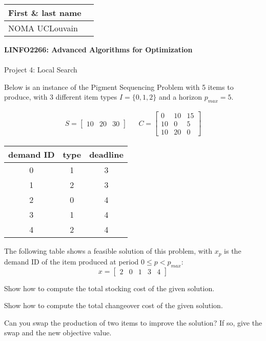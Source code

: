\documentclass[12pt]{report}
\newcommand{\answerbox}[2]{\hfill\break\\
        \framebox[\linewidth]{\parbox[c][#1][c]{\dimexpr\linewidth-2\fboxsep-2\fboxrule}{#2}}
}
\begin{document}
\hfill
\begingroup
\Large
\begin{tabular}{|l|p{6cm}|}
	\hline
	First \& last name &
	\\ \hline
	NOMA UCLouvain & 
	\\ \hline
\end{tabular}
\endgroup
\vspace{1.5cm}

\noindent
\begingroup
	\Large
	\textbf{LINFO2266: Advanced Algorithms for Optimization}\\\\
	Project 4: Local Search
\endgroup
\vspace{0.2cm}

\begin{Exercise}[title={Understanding the Pigment Sequencing Problem}]

Below is an instance of the Pigment Sequencing Problem with 5 items to produce, with 3 different item types $I = \{0, 1, 2\}$ and a horizon $p_{max} = 5$.

\begin{minipage}{0.5\textwidth}
\begin{align*}
S =
\begin{bmatrix}
10 & 20 & 30
\end{bmatrix}
&&
C =
\begin{bmatrix}
0 & 10 & 15 \\
10 & 0 & 5 \\
10 & 20 & 0
\end{bmatrix}
\end{align*}
\end{minipage}
\hfill
\begin{minipage}{0.4\textwidth}
\begin{tabular}{c|cc}
 demand ID & type & deadline \\ \hline
 0 & 1 & 3 \\
 1 & 2 & 3 \\
 2 & 0 & 4 \\
 3 & 1 & 4 \\
 4 & 2 & 4
\end{tabular}
\end{minipage}

The following table shows a feasible solution of this problem, with $x_p$ is the demand ID of the item produced at period $0 \le p < p_{max}$:
\begin{equation*}
x =
\begin{bmatrix}
2 & 0 & 1 & 3 & 4
\end{bmatrix}
\end{equation*}

\Question Show how to compute the total stocking cost of the given solution.
\answerbox{4cm}{
}

\Question Show how to compute the total changeover cost of the given solution.
\answerbox{4cm}{
}

\Question Can you swap the production of two items to improve the solution? If so, give the swap and the new objective value.
\answerbox{4cm}{
}

\end{Exercise}
\end{document}
